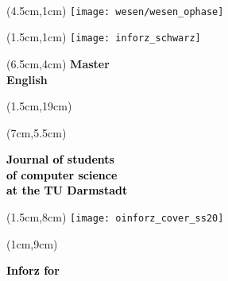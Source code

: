 \begin{titlepage}~





	\begin{textblock*}{12cm}(4.5cm,1cm)
		\texttt{[image: wesen/wesen\_ophase]}
	\end{textblock*}

	\begin{textblock*}{12cm}(1.5cm,1cm)
		\texttt{[image: inforz\_schwarz]}
	\end{textblock*}



	\begin{textblock*}{12cm}(6.5cm,4cm)
		\centering\fontsize{80}{25}\sffamily\textbf{
			\textcolor{mycolor}{Master } \\
			\textcolor{mycolor}{English}}
	\end{textblock*}


	\begin{textblock*}{12cm}(1.5cm,19cm)
		\centering\huge\sffamily\textbf{
		}
	\end{textblock*}


	\begin{textblock*}{7cm}(7cm,5.5cm)
		\begin{flushright}
			\large\sffamily\textbf{
				\textcolor{black}{Journal of students}\\
				\textcolor{black}{of computer science\\at the TU Darmstadt}}
		\end{flushright}
	\end{textblock*}

	\begin{textblock*}{18cm}(1.5cm,8cm)
		\texttt{[image: oinforz\_cover\_ss20]}
	\end{textblock*}

	\begin{textblock*}{5cm}(1cm,9cm)
		\begin{rotate}{90}
			\sffamily\huge\textbf{
				\textcolor{black}{Inforz for \ophase}}
		\end{rotate}
	\end{textblock*}



\end{titlepage}
